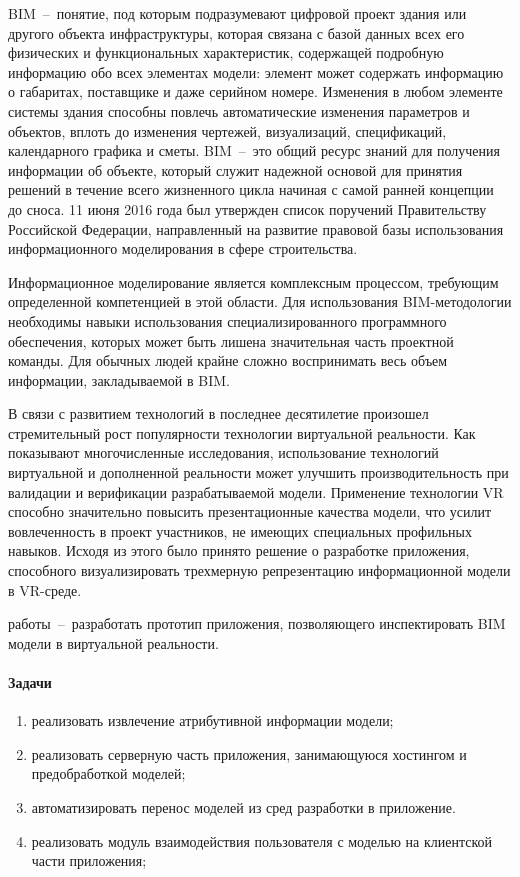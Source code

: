 ﻿
BIM~--~понятие, под которым подразумевают цифровой проект здания или другого объекта инфраструктуры,
которая связана с базой данных всех его физических и функциональных характеристик,
содержащей подробную информацию обо всех элементах модели:
элемент может содержать информацию о габаритах, поставщике и даже серийном номере. 
Изменения в любом элементе системы здания способны повлечь автоматические изменения  параметров и объектов, 
вплоть до изменения чертежей, визуализаций, спецификаций, календарного графика и сметы.
BIM~--~это общий ресурс знаний для получения информации об объекте,
который служит надежной основой для принятия решений в течение всего жизненного цикла
начиная с самой ранней концепции до сноса.
\cite{NationalBIMfaqs}
11 июня 2016 года был утвержден список поручений Правительству Российской Федерации,
направленный на развитие правовой базы использования информационного моделирования в сфере строительства.
\cite{KremlinInstraction2016}

Информационное моделирование является комплексным процессом,
требующим определенной компетенцией в этой области.
Для использования BIM-методологии необходимы навыки использования специализированного программного обеспечения,
которых может быть лишена значительная часть проектной команды.
Для обычных людей крайне сложно воспринимать весь объем информации, закладываемой в BIM.

В связи с развитием технологий в последнее десятилетие
произошел стремительный рост популярности технологии виртуальной реальности.
\cite{Cipresso2018}
Как показывают многочисленные исследования,
использование технологий виртуальной и дополненной реальности может улучшить
производительность при валидации и верификации разрабатываемой модели.
Применение технологии VR способно значительно повысить презентационные качества модели,
что усилит вовлеченность в проект участников,
не имеющих специальных профильных навыков.
\cite{Akpan2018}
Исходя из этого было принято решение о разработке приложения,
способного визуализировать трехмерную репрезентацию информационной модели в VR-среде. 

{ работы}~--~разработать прототип приложения, позволяющего инспектировать BIM модели в виртуальной реальности.

\paragraph{Задачи}
\begin{enumerate}
    \item реализовать извлечение атрибутивной информации модели;
    \item реализовать серверную часть приложения, занимающуюся хостингом и предобработкой моделей;
    \item автоматизировать перенос моделей из сред разработки в приложение.
    \item реализовать модуль взаимодействия пользователя с моделью на клиентской части приложения;
\end{enumerate}

